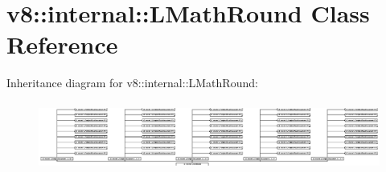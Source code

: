 \hypertarget{classv8_1_1internal_1_1_l_math_round}{}\section{v8\+:\+:internal\+:\+:L\+Math\+Round Class Reference}
\label{classv8_1_1internal_1_1_l_math_round}
Inheritance diagram for v8\+:\+:internal\+:\+:L\+Math\+Round\+:\begin{figure}[H]
\begin{center}
\leavevmode
\includegraphics[height=2.289963cm]{classv8_1_1internal_1_1_l_math_round}
\end{center}
\end{figure}
